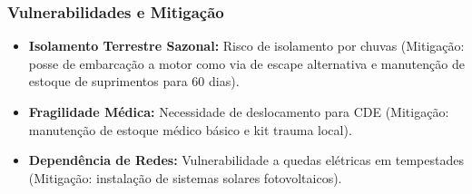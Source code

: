 \subsubsection{Vulnerabilidades e
Mitigação}

\begin{itemize}
\tightlist
\item
  \textbf{Isolamento Terrestre Sazonal:} Risco de isolamento por chuvas
  (Mitigação: posse de embarcação a motor como via de escape alternativa
  e manutenção de estoque de suprimentos para 60 dias).
\item
  \textbf{Fragilidade Médica:} Necessidade de deslocamento para CDE
  (Mitigação: manutenção de estoque médico básico e kit trauma local).
\item
  \textbf{Dependência de Redes:} Vulnerabilidade a quedas elétricas em
  tempestades (Mitigação: instalação de sistemas solares fotovoltaicos).
\end{itemize}

